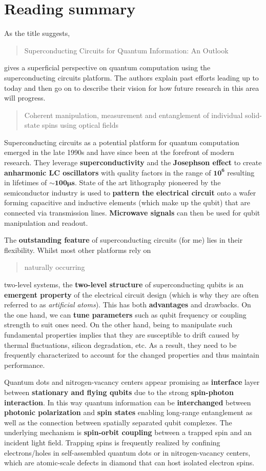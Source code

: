 \documentclass{alex_summary}
\begin{document}
\section*{Reading summary}

As the title suggests, \blockcquote{devoret_superconducting_2013}{Superconducting Circuits for Quantum Information: An Outlook} gives a superficial perspective on quantum computation using the superconducting circuits platform. The authors explain past efforts leading up to today and then go on to describe their vision for how future research in this area will progress. \blockcquote{gao_coherent_2015}{Coherent manipulation, measurement and entanglement of individual solid-state spins using optical fields}

Superconducting circuits as a potential platform for quantum computation emerged in the late 1990s and have since been at the forefront of modern research. They leverage \textbf{superconductivity} and the \textbf{Josephson effect} to create \textbf{anharmonic LC oscillators} with quality factors in the range of \( \mathbf{10^6} \) resulting in lifetimes of \( \sim \mathbf{100 \unit{\micro\s}} \). State of the art lithography pioneered by the semiconductor industry is used to \textbf{pattern the electrical circuit} onto a wafer forming capacitive and inductive elements (which make up the qubit) that are connected via transmission lines. \textbf{Microwave signals} can then be used for qubit manipulation and readout. 

The \textbf{outstanding feature} of superconducting circuits (for me) lies in their flexibility. Whilst most other platforms rely on \blockquote{naturally occurring} two-level systems, the \textbf{two-level structure} of superconducting qubits is an \textbf{emergent property} of the electrical circuit design (which is why they are often referred to as \textit{artificial atoms}). This has both \textbf{advantages} and drawbacks. On the one hand, we can \textbf{tune parameters} such as qubit frequency or coupling strength to suit ones need. On the other hand, being to manipulate such fundamental properties implies that they are susceptible to drift caused by thermal fluctuations, silicon degradation, etc. As a result, they need to be frequently characterized to account for the changed properties and thus maintain performance.

Quantum dots and nitrogen-vacancy centers appear promising as \textbf{interface} layer between \textbf{stationary and flying qubits} due to the strong \textbf{spin-photon interaction}. In this way quantum information can be \textbf{interchanged} between \textbf{photonic polarization} and \textbf{spin states} enabling long-range entanglement as well as the connection between spatially separated qubit complexes. The underlying mechanism is \textbf{spin-orbit coupling} between a trapped spin and an incident light field. Trapping spins is frequently realized by confining electrons/holes in self-assembled quantum dots or in nitrogen-vacancy centers, which are atomic-scale defects in diamond that can host isolated electron spins.
\end{document}
